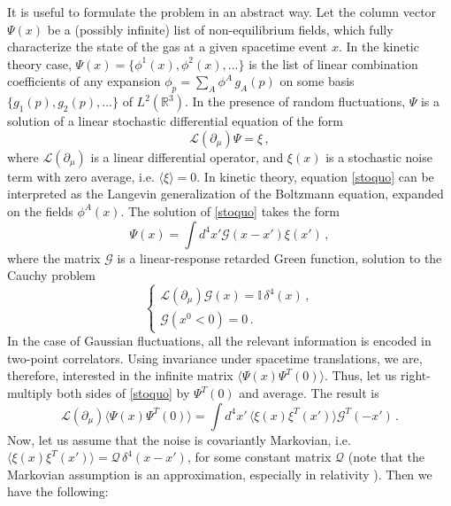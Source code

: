 \documentclass[aps,prd,preprint,nofootinbib,amsmath,amssymb,showpacs,longbibliography,singlecolumn,superscriptaddress,10pt]{revtex4-1}
\theoremstyle{plain}
\theoremstyle{definition}
\begin{document}
It is useful to formulate the problem in an abstract way.
Let the column vector $\Psi(x)$ be a (possibly infinite) list of non-equilibrium fields, which fully characterize the state of the gas at a given spacetime event $x$. In the kinetic theory case, $\Psi(x)=\{\phi^1(x),\phi^2(x),... \}$ is the list of linear combination coefficients of any expansion $\phi_p=\sum_A \phi^A \, g_A(p)$ on some basis $\{g_1(p),g_2(p),...\}$ of $L^2(\mathbb{R}^3)$. In the presence of random fluctuations, $\Psi$ is a solution of a linear stochastic differential equation of the form
\begin{equation}\label{stoquo}
    \mathcal{L}(\partial_\mu)\Psi = \xi \, ,
\end{equation}
where $\mathcal{L}(\partial_\mu)$ is a linear differential operator, and $\xi(x)$ is a stochastic noise term with zero average, i.e. $\langle \xi \rangle=0$. In kinetic theory, equation \eqref{stoquo} can be interpreted as the Langevin generalization of the Boltzmann equation, expanded on the fields $\phi^A(x)$. The solution of \eqref{stoquo} takes the form
\begin{equation}
    \Psi(x)=\int d^4x' \mathcal{G}(x{-}{x'})\xi({x'}) \, ,
\end{equation}
where the matrix $\mathcal{G}$ is a linear-response retarded Green function, solution to the Cauchy problem
\begin{equation}\label{cauchyyy}
   \begin{cases}
    \mathcal{L}(\partial_\mu)\mathcal{G}(x)=\mathbb{I} \, \delta^4(x) \, , \\
    \mathcal{G}(x^0<0)=0 \, .
  \end{cases}  
\end{equation}
In the case of Gaussian fluctuations, all the relevant information is encoded in two-point correlators. Using invariance under spacetime translations, we are, therefore, interested in the infinite matrix $\langle \Psi(x) \Psi^T(0)\rangle$. Thus, let us right-multiply both sides of \eqref{stoquo} by $\Psi^T(0)$ and average. The result is
\begin{equation}
    \mathcal{L}(\partial_\mu)\langle \Psi(x) \Psi^T(0) \rangle =\int d^4 x' \, \langle \xi(x)\xi^T(x')\rangle \mathcal{G}^T(-x') \, .
\end{equation}
Now, let us assume that the noise is covariantly Markovian, i.e. $\langle \xi(x)\xi^T(x')\rangle=\mathcal{Q} \, \delta^4(x{-}x')$, for some constant matrix $\mathcal{Q}$ (note that the Markovian assumption is an approximation, especially in relativity \cite{Petrosyan:2021lqi}). Then we have the following:
\end{document}
